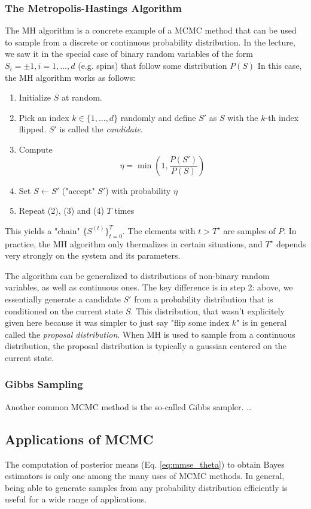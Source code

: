 \documentclass{article}
\begin{document}
\subsubsection*{The Metropolis-Hastings Algorithm}
The MH algorithm is a concrete example of a MCMC method that can be used to sample from a discrete or continuous probability distribution. In the lecture, we saw it in the special case of binary random variables of the form $S_i = \pm 1, i=1,\dots,d$ (e.g. spins) that follow some distribution $P(S)$ In this case, the MH algorithm works as follows:
\begin{enumerate}%
    \item Initialize $S$ at random.
    \item Pick an index $k\in \{1,\dots,d\}$ randomly and define $S'$ as $S$ with the $k$-th index flipped. $S'$ is called the \emph{candidate}.
    \item Compute
    $$\eta = \min\left(1,\frac{P(S')}{P(S)}\right)$$
    \item Set $S\leftarrow S'$ ("accept" $S'$) with probability $\eta$
    \item Repeat (2), (3) and (4) $T$ times
\end{enumerate}
This yields a "chain" $\{S^{(t)}\}_{t=0}^{T}$. The elements with $t>T^{\star}$ are samples of $P$. In practice, the MH algorithm only thermalizes in certain situations, and $T^{\star}$ depends very strongly on the system and its parameters.

The algorithm can be generalized to distributions of non-binary random variables, as well as continuous ones. The key difference is in step 2: above, we essentially generate a candidate $S'$ from a probability distribution that is conditioned on the current state $S$. This distribution, that wasn't explicitely given here because it was simpler to just say "flip some index $k$" is in general called the \emph{proposal distribution}. When MH is used to sample from a continuous distribution, the proposal distribution is typically a gaussian centered on the current state.
\subsubsection*{Gibbs Sampling}
Another common MCMC method is the so-called Gibbs sampler. \dots

\subsection{Applications of MCMC}
The computation of posterior means (Eq. \ref{eq:mmse_theta}) to obtain Bayes estimators is only one among the many uses of MCMC methods. In general, being able to generate samples from any probability distribution efficiently is useful for a wide range of applications.
\end{document}
